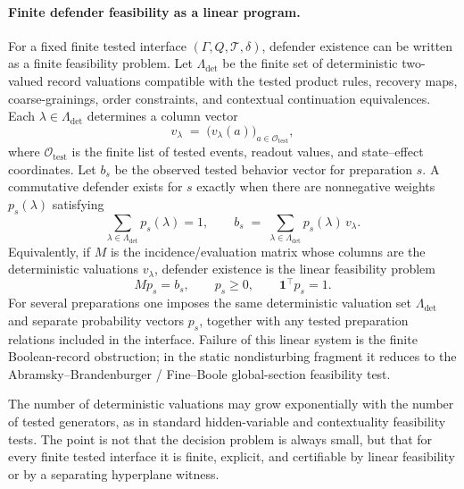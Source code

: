\documentclass[11pt]{article}
\begin{document}
\paragraph{Finite defender feasibility as a linear program.}
For a fixed finite tested interface $(\Gamma,Q,\mathcal T,\delta)$,
defender existence can be written as a finite feasibility problem.
Let $\Lambda_{\mathrm{det}}$ be the finite set of deterministic
two-valued record valuations compatible with the tested product
rules, recovery maps, coarse-grainings, order constraints, and
contextual continuation equivalences.  Each
$\lambda\in\Lambda_{\mathrm{det}}$ determines a column vector
\[
    v_\lambda
    \;=\;
    \bigl(v_\lambda(a)\bigr)_{a\in\mathcal O_{\mathrm{test}}},
\]
where $\mathcal O_{\mathrm{test}}$ is the finite list of tested
events, readout values, and state--effect coordinates.  Let $b_s$
be the observed tested behavior vector for preparation $s$.  A
commutative defender exists for $s$ exactly when there are
nonnegative weights $p_s(\lambda)$ satisfying
\[
    \sum_{\lambda\in\Lambda_{\mathrm{det}}} p_s(\lambda)=1,
    \qquad
    b_s
    \;=\;
    \sum_{\lambda\in\Lambda_{\mathrm{det}}} p_s(\lambda)\,v_\lambda.
\]
Equivalently, if $M$ is the incidence/evaluation matrix whose
columns are the deterministic valuations $v_\lambda$, defender
existence is the linear feasibility problem
\[
    M p_s = b_s, \qquad p_s\ge 0, \qquad \mathbf 1^\top p_s = 1.
\]
For several preparations one imposes the same deterministic
valuation set $\Lambda_{\mathrm{det}}$ and separate probability
vectors $p_s$, together with any tested preparation relations
included in the interface.  Failure of this linear system is the
finite Boolean-record obstruction; in the static nondisturbing
fragment it reduces to the Abramsky--Brandenburger / Fine--Boole
global-section feasibility test.

The number of deterministic valuations may grow exponentially with
the number of tested generators, as in standard hidden-variable and
contextuality feasibility tests.  The point is not that the
decision problem is always small, but that for every finite tested
interface it is finite, explicit, and certifiable by linear
feasibility or by a separating hyperplane witness.
\end{document}
